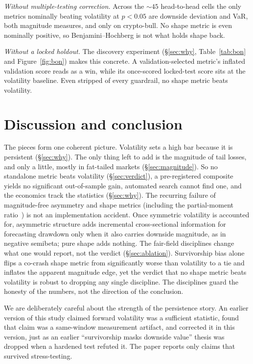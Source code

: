 \documentclass[sigconf,anonymous,nonacm]{acmart}
\begin{document}
\textit{Without multiple-testing correction.} Across the ${\sim}45$ head-to-head cells the
only metrics nominally beating volatility at $p<0.05$ are downside deviation and VaR,
both magnitude measures, and only on crypto-bull. No shape metric is even nominally
positive, so Benjamini--Hochberg is not what holds shape back.

\textit{Without a locked holdout.} The discovery experiment (\S\ref{sec:why},
Table~\ref{tab:bon} and Figure~\ref{fig:bon}) makes this concrete. A validation-selected metric's inflated validation score reads as a win, while
its once-scored locked-test score sits at the volatility baseline. Even stripped of every
guardrail, no shape metric beats volatility.

\section{Discussion and conclusion}\label{sec:discussion}
The pieces form one coherent picture. Volatility sets a high bar because it is
persistent (\S\ref{sec:why}). The only thing left to add is the magnitude of tail
losses, and only a little, mostly in fat-tailed markets (\S\ref{sec:magnitude}). So no
standalone metric beats volatility (\S\ref{sec:verdict}), a pre-registered composite
yields no significant out-of-sample gain, automated search cannot find one, and the
economics track the statistics (\S\ref{sec:why}). The recurring
failure of magnitude-free asymmetry and shape
metrics (including the partial-moment ratio~\cite{violenawrocki2016}) is
not an implementation accident. Once symmetric volatility is accounted for, asymmetric
structure adds incremental cross-sectional information for forecasting drawdown only when
it also carries downside magnitude, as in negative semibeta; pure shape adds nothing. The fair-field disciplines change what one would report, not the
verdict (\S\ref{sec:ablation}). Survivorship bias alone flips a co-crash shape metric
from significantly worse than volatility to a tie and inflates the apparent magnitude
edge, yet the verdict that no shape metric beats volatility is robust to dropping any
single discipline. The disciplines guard the honesty of the numbers, not the direction
of the conclusion.

We are deliberately careful about the strength of the
persistence story. An earlier version of this study claimed forward volatility
was a sufficient statistic, found that claim was a same-window measurement
artifact, and corrected it in this version, just as an earlier ``survivorship masks
downside value'' thesis was dropped when a hardened test refuted it. The paper
reports only claims that survived stress-testing.
\end{document}
